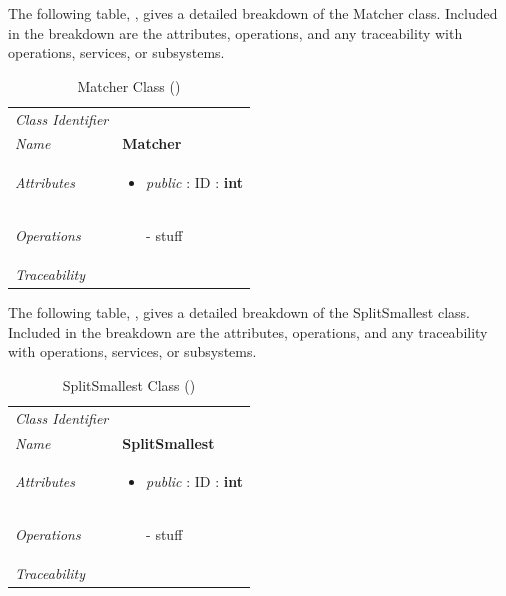 \documentclass[12pt,letterpaper]{article}
\begin{document}
The following table, , gives a detailed breakdown of the Matcher class. Included in the breakdown are the attributes, operations, and any traceability with operations, services, or subsystems.

\begin{table}[H]
    \caption{Matcher Class ()} 
	\begin{tabu} to 
		\toprule
		Class Identifier &  \\
		Name & {\bf Matcher} \\
		Attributes & 
		\begin{minipage}[t]{\linewidth}
		    \begin{itemize}
		        \item \textit{public} : ID : \bf{int}
			\end{itemize}
	    \end{minipage} \\

		Operations &
		\begin{minipage}[t]{\linewidth}
			\begin{enumerate}
			    \item[-] stuff
	        \end{enumerate}
	    \end{minipage} \\
	    	Traceability & \\
		\toprule
	\end{tabu}
\end{table}

The following table, , gives a detailed breakdown of the SplitSmallest class. Included in the breakdown are the attributes, operations, and any traceability with operations, services, or subsystems.

\begin{table}[H]
    \caption{SplitSmallest Class ()} 
	\begin{tabu} to 
		\toprule
		Class Identifier &  \\
		Name & {\bf SplitSmallest} \\
		Attributes & 
		\begin{minipage}[t]{\linewidth}
		    \begin{itemize}
		        \item \textit{public} : ID : \bf{int}
			\end{itemize}
	    \end{minipage} \\

		Operations &
		\begin{minipage}[t]{\linewidth}
			\begin{enumerate}
			    \item[-] stuff
	        \end{enumerate}
	    \end{minipage} \\
	    	Traceability & \\
		\toprule
	\end{tabu}
\end{table}
\end{document}

